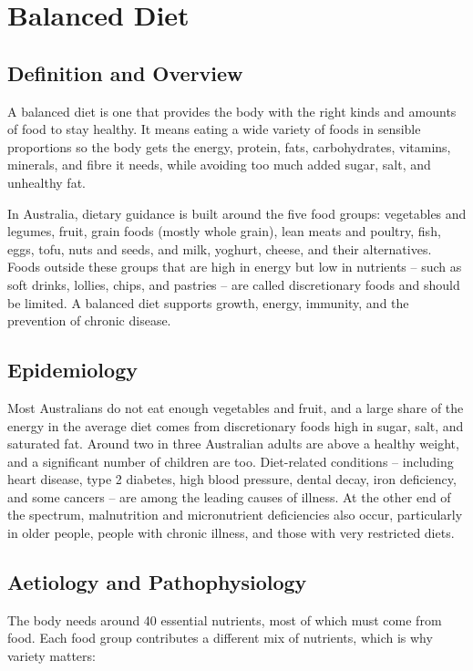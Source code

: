\chapter{Balanced Diet}

\section*{Definition and Overview}
A balanced diet is one that provides the body with the right kinds and amounts of food to stay healthy. It means eating a wide variety of foods in sensible proportions so the body gets the energy, protein, fats, carbohydrates, vitamins, minerals, and fibre it needs, while avoiding too much added sugar, salt, and unhealthy fat.

In Australia, dietary guidance is built around the five food groups: vegetables and legumes, fruit, grain foods (mostly whole grain), lean meats and poultry, fish, eggs, tofu, nuts and seeds, and milk, yoghurt, cheese, and their alternatives. Foods outside these groups that are high in energy but low in nutrients -- such as soft drinks, lollies, chips, and pastries -- are called discretionary foods and should be limited. A balanced diet supports growth, energy, immunity, and the prevention of chronic disease.

\section*{Epidemiology}
Most Australians do not eat enough vegetables and fruit, and a large share of the energy in the average diet comes from discretionary foods high in sugar, salt, and saturated fat. Around two in three Australian adults are above a healthy weight, and a significant number of children are too. Diet-related conditions -- including heart disease, type 2 diabetes, high blood pressure, dental decay, iron deficiency, and some cancers -- are among the leading causes of illness. At the other end of the spectrum, malnutrition and micronutrient deficiencies also occur, particularly in older people, people with chronic illness, and those with very restricted diets.

\section*{Aetiology and Pathophysiology}
The body needs around 40 essential nutrients, most of which must come from food. Each food group contributes a different mix of nutrients, which is why variety matters:

